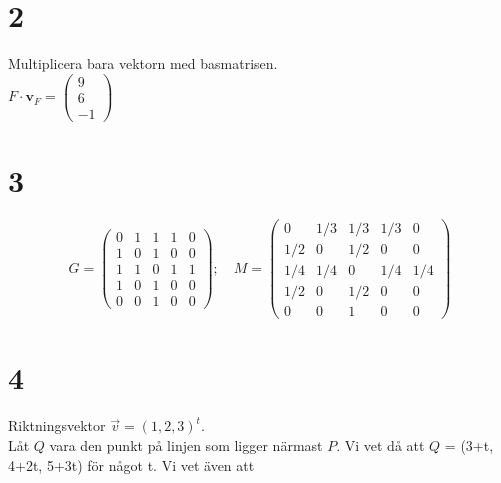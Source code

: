 \documentclass{article}
\begin{document}
\section*{2}
Multiplicera bara vektorn med basmatrisen. \\
$F \cdot \mathbf{v}_{F}
=
\begin{pmatrix}
	9 \\
	6 \\ 
	-1
\end{pmatrix}
$

\section*{3}
$$
G = 
\begin{pmatrix}
	0 & 1 & 1 & 1 & 0 \\
	1 & 0 & 1 & 0 & 0 \\
	1 & 1 & 0 & 1 & 1 \\
	1 & 0 & 1 & 0 & 0 \\
	0 & 0 & 1 & 0 & 0
\end{pmatrix}
;\quad
M = 
\begin{pmatrix}
	0 & 1/3 & 1/3 & 1/3 & 0 \\
	1/2 & 0 & 1/2 & 0 & 0 \\
	1/4 & 1/4 & 0 & 1/4 & 1/4 \\
	1/2 & 0 & 1/2 & 0 & 0 \\
	0 & 0 & 1 & 0 & 0
\end{pmatrix}
$$

\section*{4}
Riktningsvektor $\vec{v} = (1,2,3)^t$. \\
Låt $Q$ vara den punkt på linjen som ligger närmast $P$. Vi vet då att 
$Q$ = (3+t, 4+2t, 5+3t) för något t. Vi vet även att \\
\end{document}

